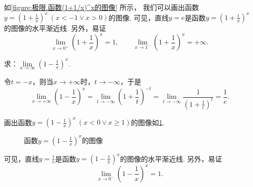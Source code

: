 如\cref{figure:极限.函数(1+1/x)^x的图像} 所示，%
我们可以画出函数\(y=\left(1+\frac{1}{x}\right)^x\ (x<-1 \lor x>0)\)的图像.
可见，直线\(y=e\)是函数\(y=\left(1+\frac{1}{x}\right)^x\)的图像的水平渐近线.
另外，易证\[
\lim\limits_{x\to0^+} \left(1+\frac{1}{x}\right)^x = 1,
\qquad
\lim\limits_{x\to1^-} \left(1+\frac{1}{x}\right)^x = +\infty.
\]


\begin{example}
求：\(\lim\limits_{x \to \infty}\left(1 - \frac{1}{x}\right)^x\).
\begin{solution}
令\(t = -x\)，则当\(x \to +\infty\)时，\(t \to -\infty\)，于是\[
\lim\limits_{x \to +\infty}\left(1 - \frac{1}{x}\right)^x
= \lim\limits_{t \to -\infty}\left(1 + \frac{1}{t}\right)^{-t}
= \lim\limits_{t \to -\infty}\frac{1}{\left(1 + \frac{1}{t}\right)^t}
= \frac{1}{e}.
\]
\end{solution}

画出函数\(y=\left(1-\frac{1}{x}\right)^x\ (x<0 \lor x\geqslant1)\)的图像如\cref{figure:极限.函数(1-1/x)^x的图像}.
\begin{figure}[ht]
\centering
{}
\caption{函数\(y=\left(1-\tfrac{1}{x}\right)^x\)的图像}
\label{figure:极限.函数(1-1/x)^x的图像}
\end{figure}
可见，直线\(y=\frac{1}{e}\)是函数\(y=\left(1-\frac{1}{x}\right)^x\)的图像的水平渐近线.
另外，易证\[
\lim\limits_{x\to0^-} \left(1-\frac{1}{x}\right)^x = 1.
\]
\end{example}

